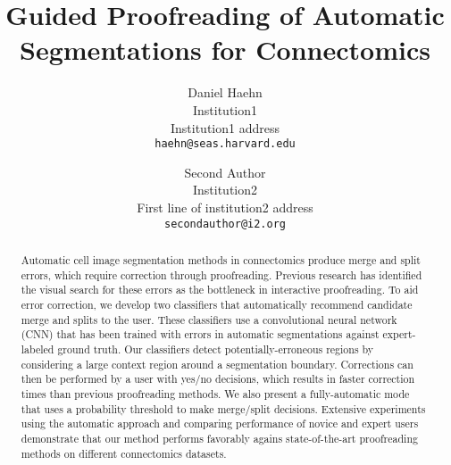 \documentclass[10pt,twocolumn,letterpaper]{article}
\begin{document}
\title{Guided Proofreading of Automatic Segmentations for Connectomics}

\author{Daniel Haehn\\
Institution1\\
Institution1 address\\
{\tt\small haehn@seas.harvard.edu}
\and
Second Author\\
Institution2\\
First line of institution2 address\\
{\tt\small secondauthor@i2.org}
}

\maketitle

\begin{abstract}
%
Automatic cell image segmentation methods in connectomics produce merge and
split errors, which require correction through proofreading. Previous research
has identified the visual search for these errors as the bottleneck in
interactive proofreading. To aid error correction, we develop two classifiers
that automatically recommend candidate merge and splits to the user. These
classifiers use a convolutional neural network (CNN) that has been trained with
errors in automatic segmentations against expert-labeled ground truth. Our
classifiers detect potentially-erroneous regions by considering a large context
region around a segmentation boundary. Corrections can then be performed by a
user with yes/no decisions,  which results in faster correction times than previous
proofreading methods. We also present a fully-automatic mode that uses a
probability threshold to make merge/split decisions. Extensive experiments using
the automatic approach and comparing performance of novice and expert users
demonstrate that our method performs favorably agains state-of-the-art
proofreading methods on different connectomics datasets.
%
\end{abstract}














{\small


}
\end{document}
